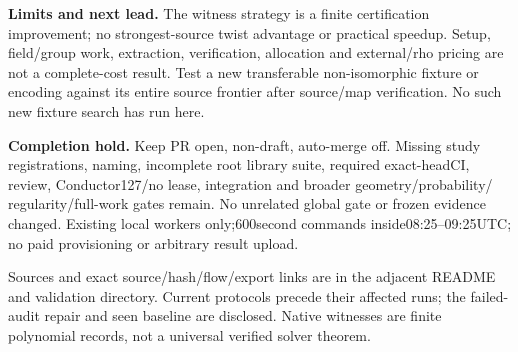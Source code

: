 \documentclass[11pt]{article}
\begin{document}
\textbf{Limits and next lead.} The witness strategy is a finite certification
improvement; no strongest-source twist advantage or practical speedup. Setup,
field/group work, extraction, verification, allocation and external/rho pricing
are not a complete-cost result. Test a new transferable non-isomorphic fixture
or encoding against its entire source frontier after source/map verification.
No such new fixture search has run here.

\textbf{Completion hold.} Keep PR open, non-draft, auto-merge off. Missing study
registrations, naming, incomplete root library suite, required exact-headCI,
review, Conductor127/no lease, integration and broader geometry/probability/
regularity/full-work gates remain. No unrelated global gate or frozen evidence
changed. Existing local workers only;600second commands inside08:25--09:25UTC;
no paid provisioning or arbitrary result upload.

\small Sources and exact source/hash/flow/export links are in the adjacent
README and validation directory. Current protocols precede their affected
runs; the failed-audit repair and seen baseline are disclosed. Native witnesses
are finite polynomial records, not a universal verified solver theorem.
\end{document}
